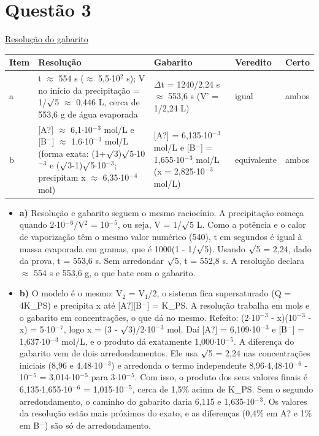 \documentclass{article}%
\begin{document}
\section*{Questão 3}%
\href{https://poliedroresolve.sistemapoliedro.com.br/vestibulares/ita/2026/ita-2-fase-dia-2-29-10-2025-2-fase-dia-2/dissertativa-3-quimica-2-fase-dia-2-ita-2026}{Resolução do gabarito}\par\smallskip%
\begin{longtable}{@{}p{} p{} p{} p{} p{}@{}}\toprule Item & Resolução & Gabarito & Veredito & Certo \\ \midrule
a & t $\approx$ 554 s ($\approx$ 5,5$\cdot$10$^2$ s); V no início da precipitação = 1/$\surd$5 $\approx$ 0,446 L, cerca de 553,6 g de água evaporada & $\Delta$t = 1240/2,24 s $\approx$ 553,6 s (V' = 1/2,24 L) & igual & ambos \\
b & {[}A?{]} $\approx$ 6,1$\cdot$10$^{-}$$^3$ mol/L e {[}B$^{-}${]} $\approx$ 1,6$\cdot$10$^{-}$$^3$ mol/L (forma exata: (1+$\surd$3)$\surd$5$\cdot$10$^{-}$$^3$ e ($\surd$3-1)$\surd$5$\cdot$10$^{-}$$^3$; precipitam x $\approx$ 6,35$\cdot$10$^{-}$$^{4}$ mol) & {[}A?{]} = 6,135$\cdot$10$^{-}$$^3$ mol/L e {[}B$^{-}${]} = 1,655$\cdot$10$^{-}$$^3$ mol/L (x = 2,825$\cdot$10$^{-}$$^3$ mol/L) & equivalente & ambos \\
\bottomrule\end{longtable}%
\begin{itemize}%
\item%
\textbf{a)} Resolução e gabarito seguem o mesmo raciocínio. A precipitação começa quando 2$\cdot$10$^{-}$$^{6}$/V$^2$ = 10$^{-}$$^{5}$, ou seja, V = 1/$\surd$5 L. Como a potência e o calor de vaporização têm o mesmo valor numérico (540), t em segundos é igual à massa evaporada em gramas, que é 1000(1 - 1/$\surd$5). Usando $\surd$5 = 2,24, dado da prova, t = 553,6 s. Sem arredondar $\surd$5, t = 552,8 s. A resolução declara $\approx$ 554 s e 553,6 g, o que bate com o gabarito.%
\item%
\textbf{b)} O modelo é o mesmo: V$_{2}$ = V$_{1}$/2, o sistema fica supersaturado (Q = 4K\_PS) e precipita x até {[}A?{]}{[}B$^{-}${]} = K\_PS. A resolução trabalha em mols e o gabarito em concentrações, o que dá no mesmo. Refeito: (2$\cdot$10$^{-}$$^3$ - x)(10$^{-}$$^3$ - x) = 5$\cdot$10$^{-}$$^{7}$, logo x = (3 - $\surd$3)/2$\cdot$10$^{-}$$^3$ mol. Daí {[}A?{]} = 6,109$\cdot$10$^{-}$$^3$ e {[}B$^{-}${]} = 1,637$\cdot$10$^{-}$$^3$ mol/L, e o produto dá exatamente 1,000$\cdot$10$^{-}$$^{5}$. A diferença do gabarito vem de dois arredondamentos. Ele usa $\surd$5 = 2,24 nas concentrações iniciais (8,96 e 4,48$\cdot$10$^{-}$$^3$) e arredonda o termo independente 8,96$\cdot$4,48$\cdot$10$^{-}$$^{6}$ - 10$^{-}$$^{5}$ = 3,014$\cdot$10$^{-}$$^{5}$ para 3$\cdot$10$^{-}$$^{5}$. Com isso, o produto dos seus valores finais é 6,135$\cdot$1,655$\cdot$10$^{-}$$^{6}$ = 1,015$\cdot$10$^{-}$$^{5}$, cerca de 1,5\% acima de K\_PS. Sem o segundo arredondamento, o caminho do gabarito daria 6,115 e 1,635$\cdot$10$^{-}$$^3$. Os valores da resolução estão mais próximos do exato, e as diferenças (0,4\% em A? e 1\% em B$^{-}$) são só de arredondamento.%
\end{itemize}%
\end{document}
